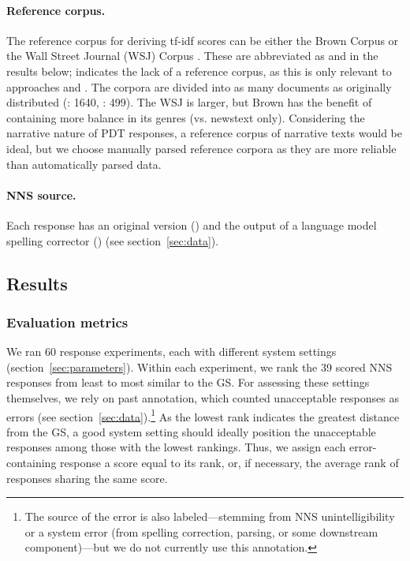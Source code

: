 \paragraph{Reference corpus.} The reference corpus for deriving tf-idf
scores can be either the Brown Corpus \citep{kucera:francis:67} or the
Wall Street Journal (WSJ) Corpus \citep{marcus-et-al:93}. These are
abbreviated as  and  in the results
below;  indicates the lack of a reference corpus, as this is
only relevant to approaches  and
. The corpora are divided into as many documents as
originally distributed (: 1640, : 499). The WSJ is
larger, but Brown has the benefit of containing more balance in its
genres (vs. newstext only). Considering the narrative nature of PDT
responses, a reference corpus of narrative texts would be ideal, but
we choose manually parsed reference corpora as they are more reliable
than automatically parsed data.

\paragraph{NNS source.} Each response has an original version
() and the output of a language model spelling corrector
() (see section~\ref{sec:data}).

\subsection{Results}

\subsubsection{Evaluation metrics}
\label{sec:metrics}

We ran 60 response experiments, each with different system settings
(section~\ref{sec:parameters}). Within each experiment, we rank the 39
scored NNS responses from least to most similar to the GS.
For assessing these settings themselves, we rely on past annotation,
which counted unacceptable responses as errors (see
section~\ref{sec:data}).\footnote{The source of the error is also
labeled---stemming from NNS unintelligibility or a system error
(from spelling correction, parsing, or some downstream
component)---but we do not currently use this annotation.}  As the
lowest rank indicates the greatest distance from the GS, a good system
setting should ideally position the unacceptable responses among those
with the lowest rankings. Thus, we assign each error-containing
response a score equal to its rank, or, if necessary, the average rank
of responses sharing the same score.

